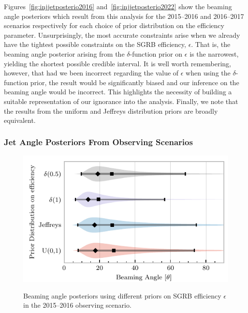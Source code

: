 \documentclass[twocolumn]{aastex61}
\begin{document}
%
Figures~\ref{fig:injjetposterio2016} and~\ref{fig:injjetposterio2022}
show the beaming angle posteriors which result from this analysis for
the 2015--2016 and 2016--2017 scenarios respectively for each choice
of prior distribution on the efficiency parameter.  Unsurprisingly,
the most accurate constraints arise when we already have the tightest
possible constraints on the \ac{SGRB} efficiency, $\epsilon$.  That
is, the beaming angle posterior arising from the $\delta$-function
prior on $\epsilon$ is the narrowest, yielding the shortest possible
credible interval.  It is well worth remembering, however, that had
we been incorrect regarding the value of $\epsilon$ when using the
$\delta$-function prior, the result would be significantly biased and
our inference on the beaming angle would be incorrect.  This
highlights the necessity of building a suitable representation of our
ignorance into the analysis.  Finally, we note that the results from
the uniform and Jeffreys distribution priors are broadly equivalent.


\subsubsection{Jet Angle Posteriors From Observing Scenarios}

\begin{figure}
\centering
{\includegraphics[width=\linewidth]{O1_beaming_posteriors_violin.pdf}}
\caption{Beaming angle posteriors using different priors on \ac{SGRB} efficiency $\epsilon$ in the 2015--2016 observing scenario.
    \label{fig:jetposterior2016}}
\end{figure}
\end{document}
